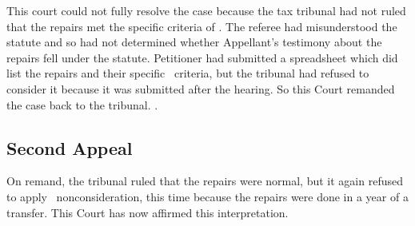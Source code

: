\documentclass[12pt,\documentclassflag]{michiganCourtOfAppealsBrief}
\begin{document}
This court could not fully resolve the case because the tax tribunal had not ruled that the repairs met the specific criteria of \mathieuGast.
The referee had misunderstood the statute and so had not determined whether Appellant's testimony about the repairs fell under the statute. 
Petitioner had submitted a spreadsheet which did list the repairs and their specific \mathieuGast\ criteria, but the tribunal had refused to consider it because it was submitted after the hearing.
So this Court remanded the case back to the tribunal. .


\subsection{Second Appeal}

On remand, the tribunal ruled that the repairs were normal, but it again refused to apply \mathieuGast\ nonconsideration, this time because
the repairs were done in a year of a transfer.
This Court has now affirmed this interpretation.
\end{document}
